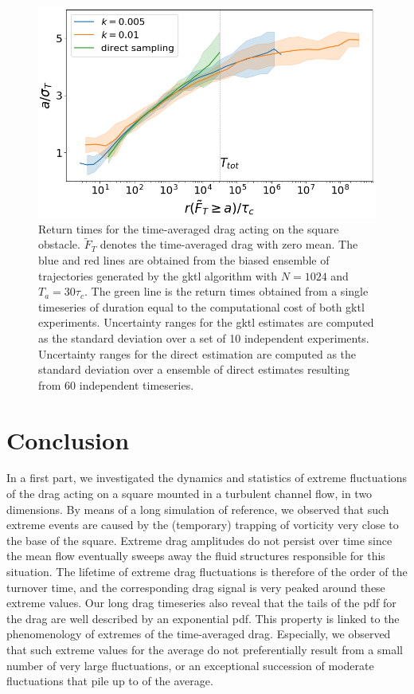 \documentclass{jfm}
\newcommand{\EL}[1]{{\color{myred}{#1}}}
\begin{document}
\begin{figure}
	\centering
	\includegraphics[width=.7\linewidth]{return_times_GKTL/return_times_GKTL}
	\caption{\label{fig:return_times_gktl} Return times for the time-averaged drag acting on the square obstacle. $\tilde{F}_T$ denotes the time-averaged drag with zero mean. The blue and red lines are obtained from the biased ensemble of trajectories generated by the \ac{gktl} algorithm with $N=1024$ and $T_a=30\tau_c$. The green line is the return times obtained from a single timeseries of duration equal to the computational cost of both \ac{gktl} experiments. Uncertainty ranges for the \ac{gktl} estimates are computed as the standard deviation over a set of 10 independent experiments. Uncertainty ranges for the direct estimation are computed as the standard deviation over a ensemble of direct estimates resulting from 60 independent timeseries.}
\end{figure}



\section{Conclusion}
\label{conlusion}


In a first part, we investigated the dynamics and statistics of extreme fluctuations of the drag acting on a square mounted in a turbulent channel flow, in two dimensions.
By means of a long simulation of reference, we observed that such extreme events are caused by the (temporary) trapping of vorticity very close to the base of the square.
Extreme drag amplitudes do not persist over time since the mean flow eventually sweeps away the fluid structures responsible for this situation.
%
The lifetime of extreme drag fluctuations is therefore of the order of the turnover time, and the corresponding drag signal is very peaked around these extreme values.
Our long drag timeseries also reveal that the tails of the \ac{pdf} for the drag are well described by an exponential \ac{pdf}.
This property is linked to the phenomenology of extremes of the time-averaged drag.
Especially, we observed that such extreme values for the average do not preferentially result from a small number of very large fluctuations, or an exceptional succession of moderate fluctuations that pile up to \EL{yield a large value} of the average.
\end{document}
